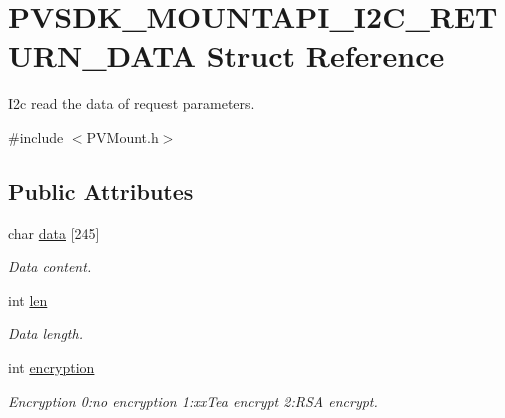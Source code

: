 \hypertarget{struct_p_v_s_d_k___m_o_u_n_t_a_p_i___i2_c___r_e_t_u_r_n___d_a_t_a}{}\section{P\+V\+S\+D\+K\+\_\+\+M\+O\+U\+N\+T\+A\+P\+I\+\_\+\+I2\+C\+\_\+\+R\+E\+T\+U\+R\+N\+\_\+\+D\+A\+TA Struct Reference}
\label{struct_p_v_s_d_k___m_o_u_n_t_a_p_i___i2_c___r_e_t_u_r_n___d_a_t_a}


I2c read the data of request parameters.  




{\ttfamily \#include $<$P\+V\+Mount.\+h$>$}

\subsection*{Public Attributes}
\begin{DoxyCompactItemize}
\item 
\mbox{\label{struct_p_v_s_d_k___m_o_u_n_t_a_p_i___i2_c___r_e_t_u_r_n___d_a_t_a_aaae373381517b9e6814f5b02ffa4cb92}} 
char \hyperlink{struct_p_v_s_d_k___m_o_u_n_t_a_p_i___i2_c___r_e_t_u_r_n___d_a_t_a_aaae373381517b9e6814f5b02ffa4cb92}{data} \mbox{[}245\mbox{]}
\begin{DoxyCompactList}\small\item\em Data content. \end{DoxyCompactList}\item 
\mbox{\label{struct_p_v_s_d_k___m_o_u_n_t_a_p_i___i2_c___r_e_t_u_r_n___d_a_t_a_aea8387aecd8b96ed03ba8a6dc10ddf42}} 
int \hyperlink{struct_p_v_s_d_k___m_o_u_n_t_a_p_i___i2_c___r_e_t_u_r_n___d_a_t_a_aea8387aecd8b96ed03ba8a6dc10ddf42}{len}
\begin{DoxyCompactList}\small\item\em Data length. \end{DoxyCompactList}\item 
\mbox{\label{struct_p_v_s_d_k___m_o_u_n_t_a_p_i___i2_c___r_e_t_u_r_n___d_a_t_a_aa33166acd077acb66758d911240182d7}} 
int \hyperlink{struct_p_v_s_d_k___m_o_u_n_t_a_p_i___i2_c___r_e_t_u_r_n___d_a_t_a_aa33166acd077acb66758d911240182d7}{encryption}
\begin{DoxyCompactList}\small\item\em Encryption 0\+:no encryption 1\+:xx\+Tea encrypt 2\+:R\+SA encrypt. \end{DoxyCompactList}\end{DoxyCompactItemize}



